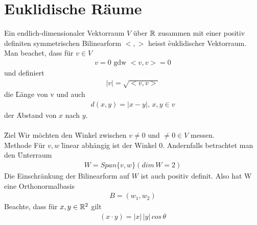 \section{Euklidische Räume}
Ein endlich-dimensionaler Vektorraum $V$ über $\mathbb{R}$ zusammen mit einer positiv definiten symmetrischen Bilinearform $<, >$ heisst \f{euklidischer Vektorraum}.
Man beachet, dass für $v \in V$
\begin{align}
v = 0 \text{ gdw } <v,v> = 0
\end{align}
und definiert 
\begin{align}
|v| = \sqrt{<v,v>}
\end{align}
die \f{Länge} von v und auch 
\begin{align}
d(x, y) = |x - y|,\, x, y \in v 
\end{align}
der \f{Abstand} von $x$ nach $y$.\\\\
\f{Ziel} Wir möchten den \f{Winkel} zwischen $v \neq 0$ und $ \neq 0 \in V$ messen.\\
\f{Methode}
Für $v, w$ \f{linear abhängig} ist der Winkel 0. Andernfalls betrachtet man den \f{Unterraum}
\begin{align}
W = Span\{v, w\} (dim\, W=2)
\end{align}
Die Einschränkung der Bilinearform auf $W$ ist auch positiv definit. Also hat W eine Orthonormalbasis
\begin{align}
B = (w_1, w_2)
\end{align}
Beachte, dass für $x, y \in \mathbb{R}^2$ gilt
\begin{align}
(x\cdot y) = |x|\,|y| \,cos\,\theta
\end{align}

